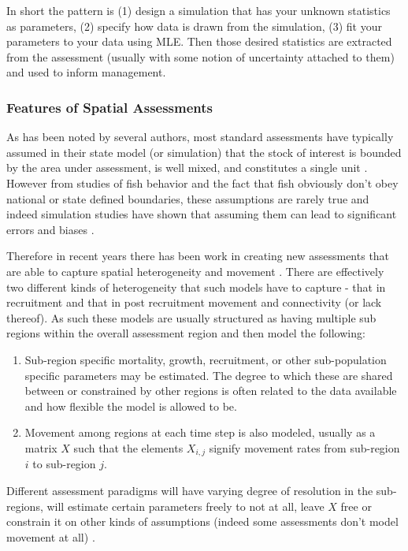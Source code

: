 \documentclass[11pt]{article}
\begin{document}
In short the pattern is (1) design a simulation that has your unknown statistics as parameters, (2) specify how data is drawn from the simulation, (3) fit your parameters to your data using MLE. Then those desired statistics are extracted from the assessment (usually with some notion of uncertainty attached to them) and used to inform management. 

\subsubsection{Features of Spatial Assessments}

As has been noted by several authors, most standard assessments have typically assumed in their state model (or simulation) that the stock of interest is bounded by the area under assessment, is well mixed, and constitutes a single unit \citep{sippel2014} \citep{punt2019} \citep{goethel2023}. However from studies of fish behavior and the fact that fish obviously don't obey national or state defined boundaries, these assumptions are rarely true and indeed simulation studies have shown that assuming them can lead to significant errors and biases \citep{lorenzen2010}. 

Therefore in recent years there has been work in creating new assessments that are able to capture spatial heterogeneity and movement \citep{punt2019} \citep{cadrin2020}. There are effectively two different kinds of heterogeneity that such models have to capture - that in recruitment and that in post recruitment movement and connectivity (or lack thereof). As such these models are usually structured as having multiple sub regions within the overall assessment region and then model the following:

\begin{enumerate}
\item Sub-region specific mortality, growth, recruitment, or other sub-population specific parameters may be estimated. The degree to which these are shared between or constrained by other regions is often related to the data available and how flexible the model is allowed to be.
\item Movement among regions at each time step is also modeled, usually as a matrix $X$ such that the elements $X_{i,j}$ signify movement rates from sub-region $i$ to sub-region $j$. 
\end{enumerate} 

Different assessment paradigms will have varying degree of resolution in the sub-regions, will estimate certain parameters freely to not at all, leave $X$ free or constrain it on other kinds of assumptions (indeed some assessments don't model movement at all) \citep{punt2019} \citep{goethel2023}. 
\end{document}
